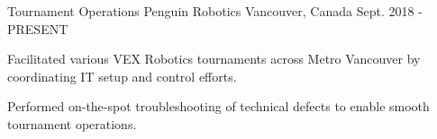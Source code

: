

\begin{cventries}

  \cventry
    {Tournament Operations} %
    {Penguin Robotics} %
    {Vancouver, Canada} %
    {Sept. 2018 - PRESENT} %
    {
      \begin{cvitems} %
        \item {Facilitated various VEX Robotics tournaments across Metro Vancouver by coordinating IT setup and control efforts.}
        \item {Performed on-the-spot troubleshooting of technical defects to enable smooth tournament operations.}
      \end{cvitems}
    }

\end{cventries}
